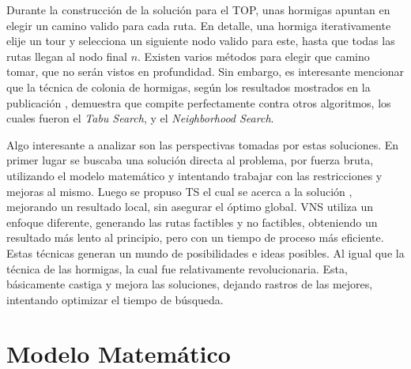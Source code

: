 \documentclass[letter, 10pt]{article}
\begin{document}
Durante la construcción de la solución para el TOP, unas hormigas apuntan en elegir un camino valido para cada ruta. En detalle, una hormiga iterativamente elije un tour y selecciona un siguiente nodo valido para este, hasta que todas las rutas llegan al nodo final $n$. Existen varios métodos para elegir que camino tomar, que no serán vistos en profundidad.
Sin embargo, es interesante mencionar que la técnica de colonia de hormigas, según los resultados mostrados en la publicación \cite{ProblemaHormigas}, demuestra que compite perfectamente contra otros algoritmos, los cuales fueron el \textit{Tabu Search}, y el \textit{Neighborhood Search}. 

Algo interesante a analizar son las perspectivas tomadas por estas soluciones. En primer lugar se buscaba una solución directa al problema, por fuerza bruta, utilizando el modelo matemático y intentando trabajar con las restricciones y mejoras al mismo. Luego se propuso TS el cual se acerca a la solución , mejorando un resultado local, sin asegurar el óptimo global. VNS utiliza un enfoque diferente, generando las rutas factibles y no factibles, obteniendo un resultado más lento al principio, pero con un tiempo de proceso más eficiente. Estas técnicas generan un mundo de posibilidades e ideas posibles. Al igual que la técnica de las hormigas, la cual fue relativamente revolucionaria. Esta, básicamente castiga y mejora las soluciones, dejando rastros de las mejores, intentando optimizar el tiempo de búsqueda.

\section{Modelo Matem\'atico}
\end{document}
